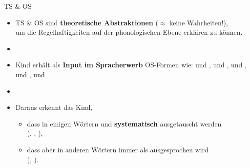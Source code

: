%
%

\begin{frame}{TS \& OS}

\begin{itemize}
	\item TS \& OS sind \textbf{theoretische Abstraktionen} ($\approx$ keine Wahrheiten!),\\
              um die Regelhaftigkeiten auf der phonologischen Ebene erklären zu können.
	\item[]
	\item Kind erhält als \textbf{Input im Spracherwerb} OS-Formen wie: \textipa{[\textscr\ a: t]} und \textipa{[\textscr~E:~t~@]}, \textipa{[\textscr\ a: t]} und \textipa{[\textscr\ E: d 5]}, \textipa{[b E t]} und \textipa{[b E t @ n]}, \textipa{[b a: t]} und \textipa{[b~E:~d~5]}, \textipa{[k I n t]} und \textipa{[k I n d 5]}
	\item[]
	\item Daraus erkennt das Kind,

	\begin{itemize}
		\item dass in einigen Wörtern \textipa{[d]} und \textipa{[t]} \textbf{systematisch} ausgetauscht werden \\ (\zB {}, , ),
		\item dass aber in anderen Wörtern \textipa{[t]} immer als \textipa{[t]} ausgesprochen wird  \\ (\zB {}, ).
	\end{itemize}
		
\end{itemize}

\end{frame}




